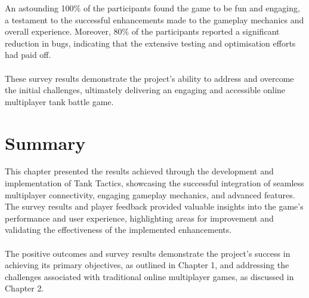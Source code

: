 \noindent An astounding 100\% of the participants found the game to be fun and engaging, a testament to the successful enhancements made to the gameplay mechanics and overall experience. Moreover, 80\% of the participants reported a significant reduction in bugs, indicating that the extensive testing and optimisation efforts had paid off.
\\
\noindent
\\
These survey results demonstrate the project's ability to address and overcome the initial challenges, ultimately delivering an engaging and accessible online multiplayer tank battle game.

\section{Summary}
This chapter presented the results achieved through the development and implementation of Tank Tactics, showcasing the successful integration of seamless multiplayer connectivity, engaging gameplay mechanics, and advanced features. The survey results and player feedback provided valuable insights into the game's performance and user experience, highlighting areas for improvement and validating the effectiveness of the implemented enhancements.
\\
\noindent
\\
The positive outcomes and survey results demonstrate the project's success in achieving its primary objectives, as outlined in Chapter 1, and addressing the challenges associated with traditional online multiplayer games, as discussed in Chapter 2.



